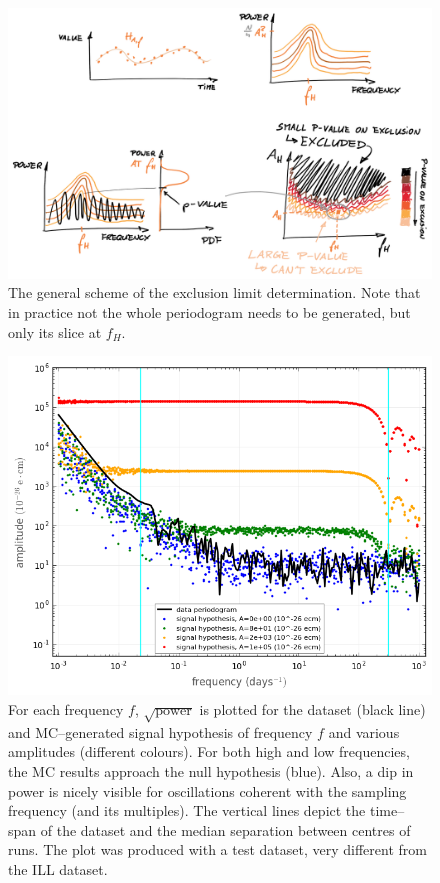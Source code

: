 \begin{figure}
  \centering \includegraphics[width=\linewidth]{gfx/axions/exclusion_region.png}
  \caption{The general scheme of the exclusion limit determination. Note that in practice not the whole periodogram needs to be generated, but only its slice at $f_H$.}
  \label{fig:exclusion_region}
\end{figure}


\begin{figure}
  \centering \includegraphics[width=\linewidth]{gfx/axions/sensitivity.png}
  \caption{For each frequency $f$, $\sqrt{\text{power}}$ is plotted for the dataset (black line) and MC--generated signal hypothesis of frequency $f$ and various amplitudes (different colours). For both high and low frequencies, the MC results approach the null hypothesis (blue). Also, a dip in power is nicely visible for oscillations coherent with the sampling frequency (and its multiples). The vertical lines depict the time--span of the dataset and the median separation between centres of runs.  The plot was produced with a test dataset, very different from the ILL dataset. }
  \label{fig:sensitivity}
\end{figure}


